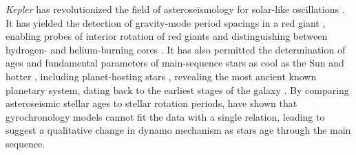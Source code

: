 \documentclass[a4paper,fleqn,usenatbib]{mnras}
\newcommand{\kepler}{\emph{Kepler}\xspace}
\begin{document}
\kepler has revolutionized the field of asteroseismology for solar-like oscillations \citep{2010PASP..122..131G,2010ApJ...713L.169C}. It has yielded the detection of gravity-mode period spacings in a red giant \citep{rggmodes,2014A&A...572L...5M}, enabling probes of interior rotation of red giants \citep{rggmoderotation,2012A&A...548A..10M} and distinguishing between hydrogen- and helium-burning cores \citep{rggmodehelium,2012A&A...540A.143M}. It has also permitted the determination of ages and fundamental parameters of main-sequence stars as cool as the Sun and hotter \citep{silvaages}, including planet-hosting stars \citep{huberplanetages,silvaplanetages,2018MNRAS.479.4786V}, revealing the most ancient known planetary system, dating back to the earliest stages of the galaxy \citep{ancientplanets}. By comparing asteroseismic stellar ages to stellar rotation periods, \citet{angusgyro} have shown that gyrochronology models cannot fit the data with a single relation, leading \citet{vansadersgyro} to suggest a qualitative change in dynamo mechanism as stars age through the main sequence. 
\end{document}
